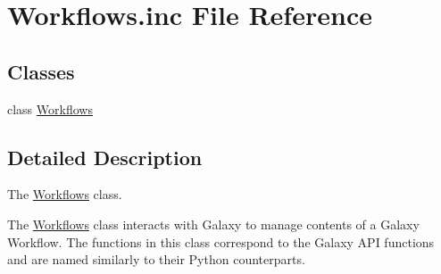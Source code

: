 \hypertarget{Workflows_8inc}{}\section{Workflows.\+inc File Reference}
\label{Workflows_8inc}
\subsection*{Classes}
\begin{DoxyCompactItemize}
\item 
class \hyperlink{classWorkflows}{Workflows}
\end{DoxyCompactItemize}


\subsection{Detailed Description}
The \hyperlink{classWorkflows}{Workflows} class.

The \hyperlink{classWorkflows}{Workflows} class interacts with Galaxy to manage contents of a Galaxy Workflow. The functions in this class correspond to the Galaxy A\+PI functions and are named similarly to their Python counterparts. 